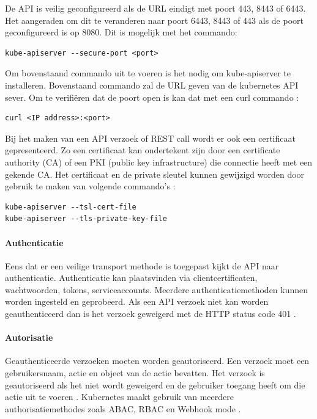 De API is veilig geconfigureerd als de URL eindigt met poort 443, 8443 of 6443. Het aangeraden om dit te veranderen naar poort 6443, 8443 of 443 als de poort geconfigureerd is op 8080. Dit is mogelijk met het commando:
\begin{lstlisting}[language=tex, caption={Veranderen poort Kubernetes API}]
kube-apiserver --secure-port <port>
\end{lstlisting}

Om bovenstaand commando uit te voeren is het nodig om kube-apiserver te installeren. 
Bovenstaand commando zal de URL geven van de kubernetes API sever. Om te verifiëren dat de poort open is kan dat met een curl commando \autocite{Rice2018}:
\begin{lstlisting}[language=tex, caption={verifiëren poort open}]
curl <IP address>:<port>
\end{lstlisting}

Bij het maken van een API verzoek of REST call wordt er ook een certificaat gepresenteerd. Zo een certificaat kan ondertekent zijn door een certificate authority (CA) of een PKI (public key infrastructure) die connectie heeft met een gekende CA. Het certificaat en de private sleutel kunnen gewijzigd worden door gebruik te maken van volgende commando's \autocite{KubernetesDocs-2023}:
\begin{lstlisting}[language=tex, caption={Wijzigen certificaat en private sleutel}]
kube-apiserver --tsl-cert-file
kube-apiserver --tls-private-key-file
\end{lstlisting}

\paragraph{Authenticatie}
Eens dat er een veilige transport methode is toegepast kijkt de API naar authenticatie. Authenticatie kan plaatsvinden via clientcertificaten, wachtwoorden, tokens, serviceaccounts. Meerdere authenticatiemethoden kunnen worden ingesteld en geprobeerd.
Als een API verzoek niet kan worden geauthenticeerd dan is het verzoek geweigerd met de HTTP status code 401 \autocite{KubernetesDocs-2023}.  

\paragraph{Autorisatie}
Geauthenticeerde verzoeken moeten worden geautoriseerd. Een verzoek moet een gebruikersnaam, actie en object van de actie bevatten. Het verzoek is geautoriseerd als het niet wordt geweigerd en de gebruiker toegang heeft om die actie uit te voeren \autocite{KubernetesDocs-2023}.
Kubernetes maakt gebruik van meerdere authorisatiemethodes zoals ABAC, RBAC en Webhook mode \autocite{KubernetesDocs-2023}. 

